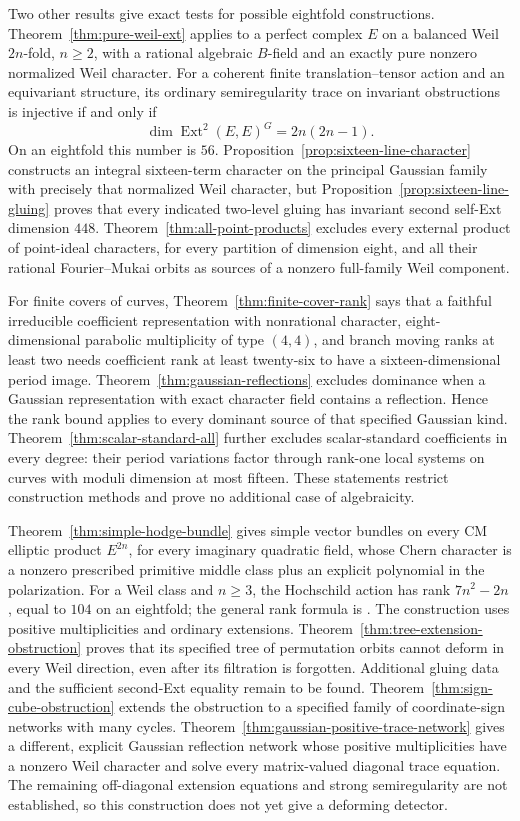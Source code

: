 Two other results give exact tests for possible eightfold constructions. Theorem~\ref{thm:pure-weil-ext} applies to a perfect complex $E$ on a balanced Weil $2n$-fold, $n\ge2$, with a rational algebraic $B$-field and an exactly pure nonzero normalized Weil character. For a coherent finite translation--tensor action and an equivariant structure, its ordinary semiregularity trace on invariant obstructions is injective if and only if
\[
 \dim\operatorname{Ext}^2(E,E)^G=2n(2n-1).
\]
On an eightfold this number is $56$. Proposition~\ref{prop:sixteen-line-character} constructs an integral sixteen-term character on the principal Gaussian family with precisely that normalized Weil character, but Proposition~\ref{prop:sixteen-line-gluing} proves that every indicated two-level gluing has invariant second self-Ext dimension $448$. Theorem~\ref{thm:all-point-products} excludes every external product of point-ideal characters, for every partition of dimension eight, and all their rational Fourier--Mukai orbits as sources of a nonzero full-family Weil component.

For finite covers of curves, Theorem~\ref{thm:finite-cover-rank} says that a faithful irreducible coefficient representation with nonrational character, eight-dimensional parabolic multiplicity of type $(4,4)$, and branch moving ranks at least two needs coefficient rank at least twenty-six to have a sixteen-dimensional period image. Theorem~\ref{thm:gaussian-reflections} excludes dominance when a Gaussian representation with exact character field contains a reflection. Hence the rank bound applies to every dominant source of that specified Gaussian kind. Theorem~\ref{thm:scalar-standard-all} further excludes scalar-standard coefficients in every degree: their period variations factor through rank-one local systems on curves with moduli dimension at most fifteen. These statements restrict construction methods and prove no additional case of algebraicity.


Theorem~\ref{thm:simple-hodge-bundle} gives simple vector bundles on
every CM elliptic product $E^{2n}$, for every imaginary quadratic
field, whose Chern character is a nonzero prescribed primitive
middle class plus an explicit polynomial in the polarization.
For a Weil class and $n\ge3$, the Hochschild action has rank
$7n^2-2n$, equal to $104$ on an eightfold; the general rank formula
is \cite[Theorem~A6]{BBK3Sixfolds}.
The construction uses positive multiplicities and ordinary extensions.
Theorem~\ref{thm:tree-extension-obstruction} proves that its specified
tree of permutation orbits cannot deform in every Weil direction,
even after its filtration is forgotten.  Additional gluing data and
the sufficient second-Ext equality remain to be found.
Theorem~\ref{thm:sign-cube-obstruction} extends the obstruction to a
specified family of coordinate-sign networks with many cycles.
Theorem~\ref{thm:gaussian-positive-trace-network} gives a different,
explicit Gaussian reflection network whose positive multiplicities
have a nonzero Weil character and solve every matrix-valued diagonal
trace equation.  The remaining off-diagonal extension equations and
strong semiregularity are not established, so this construction does
not yet give a deforming detector.

